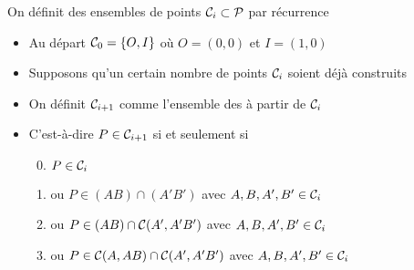 \begin{frame}
\begin{minipage}{0.49\textwidth}
On définit des ensembles de points $\mathcal{C}_i \subset \mathcal{P}$ par récurrence  
\end{minipage}
\begin{minipage}{0.49\textwidth}
\end{minipage}

\pause

\begin{itemize}[<+->]
  \item Au départ $\mathcal{C}_0 = \{ O, I\}$ où $O=(0,0)$ et $I=(1,0)$
  
  \item Supposons qu'un certain nombre de points $\mathcal{C}_i$
  soient déjà construits
  
  \item On définit $\mathcal{C}_{i+1}$ comme l'ensemble des 
  à partir de $\mathcal{C}_i$
  
  \item C'est-à-dire $P \in \mathcal{C}_{i+1}$ si et seulement si
  \begin{enumerate}[<+->]
    \setcounter{enumi}{-1}
    \item $P \in \mathcal{C}_i$
    
    \item ou $P \in (AB) \cap (A'B')$ avec $A, B, A', B' \in \mathcal{C}_i$
    
    \item ou $P \in (AB) \cap \mathcal{C}(A',A'B')$ avec $A, B, A', B' \in \mathcal{C}_i$
    
    \item ou $P \in \mathcal{C}(A,AB) \cap \mathcal{C}(A',A'B')$ avec $A, B, A', B' \in \mathcal{C}_i$
  \end{enumerate}
\end{itemize}



\end{frame}


\begin{frame}
\end{frame}


